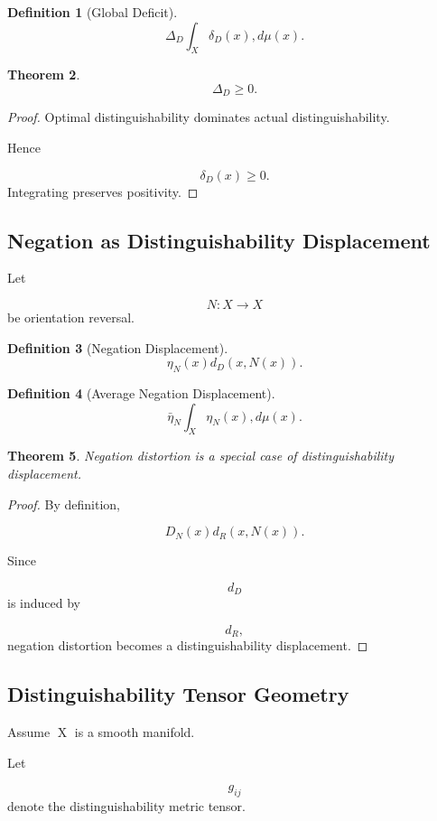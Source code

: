 \documentclass[12pt]{article}
\newtheorem{theorem}{Theorem}[section]
\newtheorem{definition}[theorem]{Definition}
\theoremstyle{remark}
\begin{document}
\begin{definition}[Global Deficit]
\[
\Delta_D
\int_X
\delta_D(x)
,d\mu(x).
\]
\end{definition}

\begin{theorem}
\[
\Delta_D\ge0.
\]
\end{theorem}
\begin{proof}
Optimal distinguishability dominates actual distinguishability.

Hence

\[
\delta_D(x)\ge0.
\]
Integrating preserves positivity.
\end{proof}

\subsection{Negation as Distinguishability Displacement}

Let

\[
N:X\rightarrow X
\]
be orientation reversal.

\begin{definition}[Negation Displacement]
\[
\eta_N(x)
d_D(x,N(x)).
\]
\]
\end{definition}

\begin{definition}[Average Negation Displacement]
\[
\bar\eta_N
\int_X
\eta_N(x)
,d\mu(x).
\]
\end{definition}

\begin{theorem}
Negation distortion is a special case of distinguishability displacement.
\end{theorem}

\begin{proof}
By definition,

\[
D_N(x)
d_R(x,N(x)).
\]

Since

\[
d_D
\]
is induced by

\[
d_R,
\]
negation distortion becomes a distinguishability displacement.
\end{proof}

\subsection{Distinguishability Tensor Geometry}

Assume X is a smooth manifold.

Let

\[
g_{ij}
\]
denote the distinguishability metric tensor.
\end{document}
